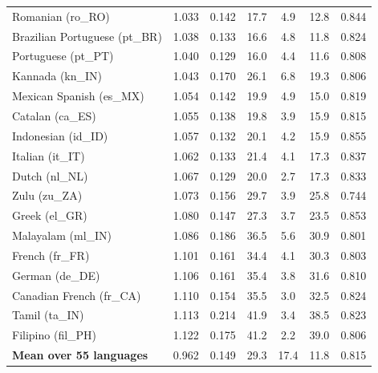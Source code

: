 \begin{longtable}{@{}lcccccc@{}}
    Romanian (ro\_RO) & 1.033 & 0.142 & 17.7 & 4.9 & 12.8 & 0.844 \\
    Brazilian Portuguese (pt\_BR) & 1.038 & 0.133 & 16.6 & 4.8 & 11.8 & 0.824 \\
    Portuguese (pt\_PT) & 1.040 & 0.129 & 16.0 & 4.4 & 11.6 & 0.808 \\
    Kannada (kn\_IN) & 1.043 & 0.170 & 26.1 & 6.8 & 19.3 & 0.806 \\
    Mexican Spanish (es\_MX) & 1.054 & 0.142 & 19.9 & 4.9 & 15.0 & 0.819 \\
    Catalan (ca\_ES) & 1.055 & 0.138 & 19.8 & 3.9 & 15.9 & 0.815 \\
    Indonesian (id\_ID) & 1.057 & 0.132 & 20.1 & 4.2 & 15.9 & 0.855 \\
    Italian (it\_IT) & 1.062 & 0.133 & 21.4 & 4.1 & 17.3 & 0.837 \\
    Dutch (nl\_NL) & 1.067 & 0.129 & 20.0 & 2.7 & 17.3 & 0.833 \\
    Zulu (zu\_ZA) & 1.073 & 0.156 & 29.7 & 3.9 & 25.8 & 0.744 \\
    Greek (el\_GR) & 1.080 & 0.147 & 27.3 & 3.7 & 23.5 & 0.853 \\
    Malayalam (ml\_IN) & 1.086 & 0.186 & 36.5 & 5.6 & 30.9 & 0.801 \\
    French (fr\_FR) & 1.101 & 0.161 & 34.4 & 4.1 & 30.3 & 0.803 \\
    German (de\_DE) & 1.106 & 0.161 & 35.4 & 3.8 & 31.6 & 0.810 \\
    Canadian French (fr\_CA) & 1.110 & 0.154 & 35.5 & 3.0 & 32.5 & 0.824 \\
    Tamil (ta\_IN) & 1.113 & 0.214 & 41.9 & 3.4 & 38.5 & 0.823 \\
    Filipino (fil\_PH) & 1.122 & 0.175 & 41.2 & 2.2 & 39.0 & 0.806 \\
    \midrule
    \textbf{Mean over 55 languages} & 0.962 & 0.149 & 29.3 & 17.4 & 11.8 & 0.815 \\
\end{longtable}
\endgroup
